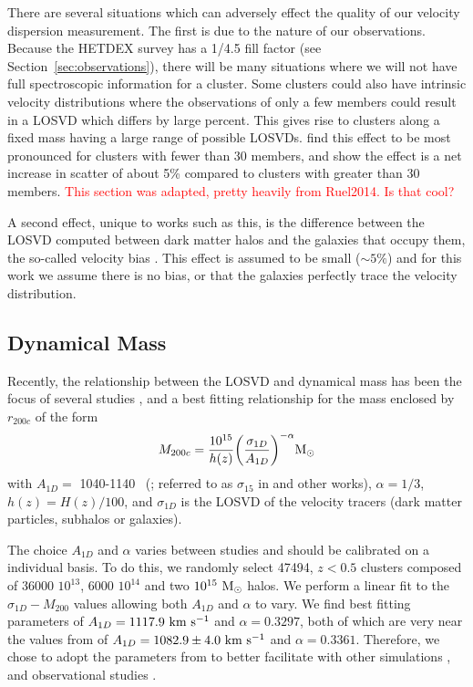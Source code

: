 \documentclass[apj, revtex4]{emulateapj}
\newcommand{\editorial}[1]{\textcolor{red}{#1}}
\begin{document}
There are several situations which can adversely effect the quality of our velocity dispersion measurement. The first is due to the nature of our observations. Because the HETDEX survey has a 1/4.5 fill factor (see Section~\ref{sec:observations}), there will be many situations where we will not have full spectroscopic information for a cluster. Some clusters could also have intrinsic velocity distributions where the observations of only a few members could result in a LOSVD which differs by large percent. This gives rise to clusters along a fixed mass having a large range of possible LOSVDs. \cite{Saro2013} find this effect to be most pronounced for clusters with fewer than 30 members, and \cite{Ruel2014} show the effect is a net increase in scatter of about 5\% compared to clusters with greater than 30 members. \editorial{This section was adapted, pretty heavily from Ruel2014. Is that cool?}

A second effect, unique to works such as this, is the difference between the LOSVD computed between dark matter halos and the galaxies that occupy them, the so-called velocity bias . This effect is assumed to be small ($\sim5\%$) and for this work we assume there is no bias, or that the galaxies perfectly trace the velocity distribution.

\subsection{Dynamical Mass}\label{sec:mass}
Recently, the relationship between the LOSVD and dynamical mass has been the focus of several studies , and a best fitting relationship for the mass enclosed by $r_{200c}$ of the form
\begin{equation}
	M_{200c} = \frac{10^{15}}{h(z)} \bigg{(}\frac{\sigma_{1D}}{A_{1D}} \bigg{)}^{-\alpha} \hbox{$\mathrm{M}_\odot$}
\end{equation}
with $A_{1D} =$ 1040-1140 \kms\ (\citealt{Munari2013}; referred to as $\sigma_{15}$ in \citealt{Evrard2008} and other works), $\alpha = 1/3$, $h(z) = H(z)/100$, and $\sigma_{1D}$ is the LOSVD of the velocity tracers (dark matter particles, subhalos or galaxies).

The choice $A_{1D}$ and $\alpha$ varies between studies  and should be calibrated on a individual basis. To do this, we randomly select 47494, $z<0.5$ clusters composed of 36000 $10^{13}$, 6000 $10^{14}$ and two $10^{15}~\hbox{$\mathrm{M}_\odot$}$ halos. We perform a linear fit to the $\sigma_{1D}-M_{200}$ values allowing both $A_{1D}$ and $\alpha$ to vary. We find best fitting parameters of $A_{1D} = 1117.9~\hbox{km~s$^{-1}$}$ and $\alpha = 0.3297$, both of which are very near the values from \cite{Evrard2008} of $A_{1D} = 1082.9 \pm 4.0~\hbox{km~s$^{-1}$}$ and $\alpha = 0.3361$. Therefore, we chose to adopt the parameters from \cite{Evrard2008} to better facilitate with other simulations , and observational studies .
\end{document}
